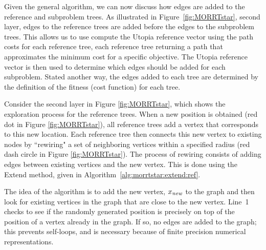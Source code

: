 \documentclass{article}
\begin{document}

Given the general algorithm, we can now discuss how edges are added to the reference and subproblem trees.  
As illustrated in Figure~\ref{fig:MORRTstar}, second layer, edges to the reference trees are added before the edges to the subproblem trees.  
This allows us to use compute the Utopia reference vector using the path costs for each reference tree, each reference tree returning a path that approximates the minimum cost for a specific objective.  
The Utopia reference vector is then used to determine which edges should be added for each subproblem. Stated another way, the edges added to each tree are determined by the definition of the fitness (cost function) for each tree.


Consider the second layer in Figure \ref{fig:MORRTstar}, which shows the exploration process for the reference trees.
When a new position is obtained (red dot in Figure \ref{fig:MORRTstar}), all reference trees add a vertex that corresponds to this new location.  
Each reference tree then connects this new vertex to existing nodes by ``rewiring" a set of neighboring vertices within a specified radius (red dash circle in Figure \ref{fig:MORRTstar}).  
The process of rewiring consists of adding edges between existing vertices and the new vertex.  This is done using the {\sc Extend} method, given in Algorithm~\ref{alg:morrtstar:extend:ref}.

The idea of the algorithm is to add the new vertex, $x_{\it new}$ to the graph and then look for existing vertices in the graph that are close to the new vertex. 
Line~1 checks to see if the randomly generated position is precisely on top of the position of a vertex already in the graph.  
If so, no edges are added to the graph; this prevents self-loops, and is necessary because of finite precision numerical representations.  
\end{document}
